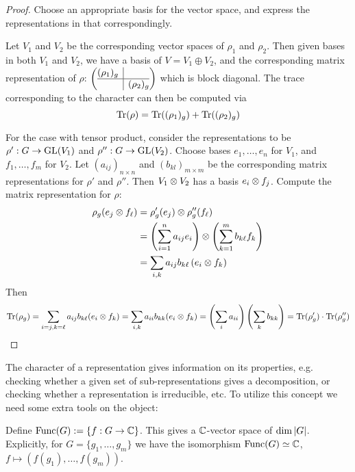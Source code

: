 \documentclass{article}
\begin{document}
\begin{proof}
    Choose an appropriate basis for the vector space, and express the representations in that correspondingly.

    Let $V_1$ and $V_2$ be the corresponding vector spaces of $\rho_1$ and $\rho_2$. Then given bases in both $V_1$ and $V_2$, we have a basis of $V = V_1 \oplus V_2$, and the corresponding matrix representation of $\rho$:
    $
    \left(\begin{array}{@{}c|c@{}}
        (\rho_1)_g & \\ \hline
        & (\rho_2)_g \\
      \end{array}\right)
    $
    which is block diagonal. The trace corresponding to the character can then be computed via
    \[
        \mathrm{Tr}(\rho) = \mathrm{Tr}((\rho_1)_g) + \mathrm{Tr}((\rho_2)_g)
    \]

    For the case with tensor product, consider the representations to be $\rho': G \to \mathrm{GL}(V_1)$ and $\rho'': G \to \mathrm{GL}(V_2)$. Choose bases $e_1, \dots, e_n$ for $V_1$, and $f_1, \dots, f_m$ for $V_2$. Let $(a_{ij})_{n \times n}$ and $(b_{kl})_{m \times m}$ be the corresponding matrix representations for $\rho'$ and $\rho''$. Then $V_1 \otimes V_2$ has a basis $e_i \otimes f_j$. Compute the matrix representation for $\rho$:
    \begin{align*}
        \rho_g(e_j \otimes f_{\ell})
        & = \rho_g'(e_j) \otimes \rho_g'' (f_{\ell}) \\
        & = \left( \sum_{i = 1}^n a_{ij} e_i \right) \otimes \left( \sum_{k = 1}^m b_{k\ell} f_k \right) \\
        & = \sum_{i, k} a_{ij} b_{k\ell} \left( e_i \otimes f_k \right)
    \end{align*}
    Then
    \[
        \mathrm{Tr}(\rho_g) = \sum_{i = j, k = \ell} a_{ij} b_{k\ell} (e_i \otimes f_k) = \sum_{i, k} a_{ii} b_{kk} (e_i \otimes f_k) = \left( \sum_{i} a_{ii} \right) \left( \sum_{k} b_{kk} \right) = \mathrm{Tr}(\rho_g')\cdot\mathrm{Tr}(\rho_g'')
    \]
\end{proof}

\textstart
The character of a representation gives information on its properties, e.g. checking whether a given set of sub-representations gives a decomposition, or checking whether a representation is irreducible, etc. To utilize this concept we need some extra tools on the object:

\begin{notation}
    Define $\mathrm{Func}(G) := \{ f: G \to \mathbb{C} \}$. This gives a $\mathbb{C}$-vector space of $\dim \left|G\right|$. Explicitly, for $G = \{g_1, \dots, g_m\}$ we have the isomorphism $\mathrm{Func}(G) \simeq \mathbb{C}$, $f \mapsto (f(g_1), \dots, f(g_m))$.
\end{notation}
\end{document}
